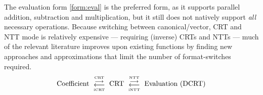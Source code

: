 The evaluation form \eqref{form:eval} is the preferred form, as it supports parallel addition, subtraction and multiplication, but it still does not natively support \textit{all} necessary operations. Because switching between canonical/vector, CRT and NTT mode is relatively expensive --- requiring (inverse) CRTs and NTTs --- much of the relevant literature \cite{cryptoeprint:2012/099, cryptoeprint:2016/510, cryptoeprint:2018/117, cryptoeprint:2021/204} improves upon existing functions by finding new approaches and approximations that limit the number of format-switches required. 
\begin{equation*}
    \raisebox{0.3ex}{\text{ Coefficient }}
    \overset{\text{\tiny CRT}}{\underset{\text{\tiny iCRT}}{\overset{\longrightarrow}{\longleftarrow}}}
    \raisebox{0.3ex}{\text{ CRT }}
    \overset{\text{\tiny NTT}}{\underset{\text{\tiny iNTT}}{\overset{\longrightarrow}{\longleftarrow}}}
    \raisebox{0.3ex}{\text{ Evaluation (DCRT) }}
\end{equation*}

